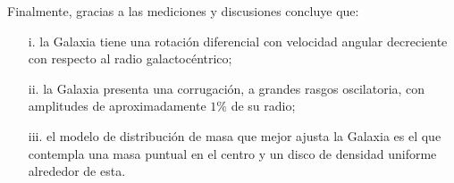 Finalmente, gracias a las mediciones y discusiones concluye que:
\begin{enumerate}
\item[i.] la Galaxia tiene una rotación diferencial con velocidad angular decreciente con respecto al radio galactocéntrico;

\item[ii.] la Galaxia presenta una corrugación, a grandes rasgos oscilatoria, con amplitudes de aproximadamente $1\%$ de su radio;

\item[iii.] el modelo de distribución de masa que mejor ajusta la Galaxia es el que contempla una masa puntual en el centro y un disco de densidad uniforme alrededor de esta.
\end{enumerate}
